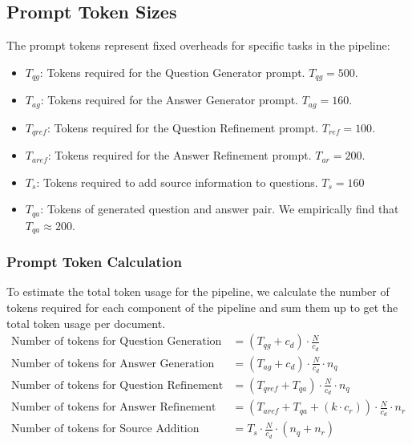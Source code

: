 \subsection*{Prompt Token Sizes}
The prompt tokens represent fixed overheads for specific tasks in the pipeline:
\begin{itemize}
    \item \( T_{qg} \): Tokens required for the Question Generator prompt. \( T_{qg} = 500 \).
    \item \( T_{ag} \): Tokens required for the Answer Generator prompt. \( T_{ag} = 160 \).
    \item \( T_{qref} \): Tokens required for the Question Refinement prompt. \( T_{ref} = 100 \).
    \item \( T_{aref} \): Tokens required for the Answer Refinement prompt.  \( T_{ar} = 200 \).
    \item \( T_s \): Tokens required to add source information to questions.  \( T_s = 160 \)
    \item \( T_{qa}\): Tokens of generated question and answer pair. We empirically find that \( T_{qa} \approx 200 \).
\end{itemize}



\subsubsection*{Prompt Token Calculation}

To estimate the total token usage for the pipeline, we calculate the number of tokens required for each component of the pipeline
and sum them up to get the total token usage per document.
\begin{align*}
\text{Number of tokens for Question Generation} & = \left(T_{qg} + c_d\right) \cdot \frac{N}{c_d} \\
\text{Number of tokens for Answer Generation} & = \left(T_{ag} + c_d\right) \cdot \frac{N}{c_d} \cdot n_q \\
\text{Number of tokens for Question Refinement} & = \left(T_{qref} + T_{qa}\right) \cdot \frac{N}{c_d} \cdot n_q \\
\text{Number of tokens for Answer Refinement} & = \left(T_{aref} + T_{qa} + \left(k \cdot c_r\right)\right) \cdot \frac{N}{c_d} \cdot n_r \\
\text{Number of tokens for Source Addition} & = T_s \cdot \frac{N}{c_d} \cdot (n_q + n_r)
\end{align*}
